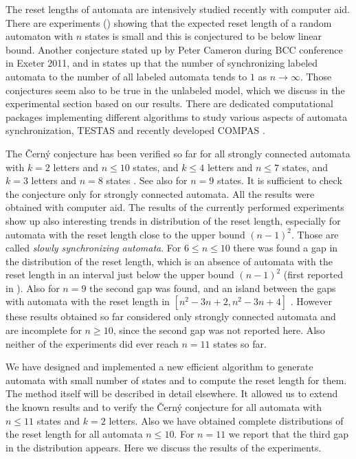 \documentclass[runningheads,a4paper]{llncs}
\newcommand{\<}{\langle}
\renewcommand{\>}{\rangle}
\begin{document}
The reset lengths of automata are intensively studied recently with computer aid. There are experiments (\cite{Ro2009,ST2011}) showing that the expected reset length of a random automaton with $n$ states is small and this is conjectured to be below linear bound. Another conjecture stated up by Peter Cameron during BCC conference in Exeter 2011, and in \cite{ST2011} states up that the number of synchronizing labeled automata to the number of all labeled automata tends to $1$ as $n \to \infty$. Those conjectures seem also to be true in the unlabeled model, which we discuss in the experimental section based on our results. There are dedicated computational packages implementing different algorithms to study various aspects of automata synchronization, TESTAS \cite{Tr2003} and recently developed COMPAS \cite{CR2011}.

The \v{C}ern\'{y} conjecture has been verified so far for all strongly connected automata with $k=2$ letters and $n\leq 10$ states, and $k\leq 4$ letters and $n\leq 7$ states, and $k=3$ letters and $n=8$ states \cite{Tr2006,Tr2011}. See also \cite{AGV2010} for $n=9$ states. It is sufficient to check the conjecture only for strongly connected automata. All the results were obtained with computer aid. The results of the currently performed experiments show up also interesting trends in distribution of the reset length, especially for automata with the reset length close to the upper bound $(n-1)^2$. Those are called \emph{slowly synchronizing automata}. For $6\le n\le 10$ there was found a gap in the distribution of the reset length, which is an absence of automata with the reset length in an interval just below the upper bound $(n-1)^2$ (first reported in \cite{Tr2006}). Also for $n=9$ the second gap was found, and an island between the gaps with automata with the reset length in $[n^2-3n+2,n^2-3n+4]$ \cite{AGV2010}. However these results obtained so far considered only strongly connected automata and are incomplete for $n\ge 10$, since the second gap was not reported here. Also neither of the experiments did ever reach $n=11$ states so far.

We have designed and implemented a new efficient algorithm to generate automata with small number of states and to compute the reset length for them. The method itself will be described in detail elsewhere. It allowed us to extend the known results and to verify the \v{C}ern\'{y} conjecture for all automata with $n \le 11$ states and $k=2$ letters. Also we have obtained complete distributions of the reset length for all automata $n \le 10$. For $n=11$ we report that the third gap in the distribution appears. Here we discuss the results of the experiments.
\end{document}

